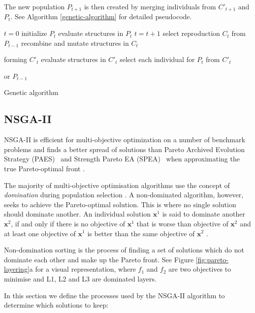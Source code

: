 \documentclass[sigconf]{acmart}
\begin{document}
The new population $P_{t+1}$ is then created by merging individuals from $C'_{t+1}$ and $P_{t}$. See Algorithm \ref{genetic-algorithm} for detailed pseudocode.
%
\begin{algorithm}[t]
\begin{algorithmic}[1]
\State $t=0$
\State initialize $P_{t}$
\State evaluate structures in $P_{t}$
\State $t=t+1$
\State select reproduction $C_{t}$ from $P_{t-1}$
\State recombine and mutate structures in $C_{t}$

forming $C'_{t}$
\State evaluate structures in $C'_{t}$
\State select each individual for $P_{t}$ from $C'_{t}$ 

or $P_{t-1}$
\EndWhile
\caption{Genetic algorithm \cite{FogelDavidB2009}}
\label{genetic-algorithm}
\end{algorithmic}
\end{algorithm}



\subsection{NSGA-II}


NSGA-II is efficient for multi-objective optimization on a number of benchmark problems and finds a better spread of solutions than Pareto Archived Evolution Strategy (PAES)~\cite{Knowles1999} and Strength Pareto EA (SPEA)~\cite{Zitzler2006} when approximating the true Pareto-optimal front \cite{Valkanas2014}.

The majority of multi-objective optimisation algorithms use the concept of \emph{domination} during population selection \cite{Burke2014}. A non-dominated algorithm, however, seeks to achieve the Pareto-optimal solution. This is where no single solution should dominate another. An individual solution $\mathbf{x}^{1}$ is said to dominate another $\mathbf{x}^{2}$, if and only if there is no objective of $\mathbf{x}^{1}$ that is worse than objective of $\mathbf{x}^{2}$ and at least one objective of $\mathbf{x}^{1}$ is better than the same objective of $\mathbf{x}^{2}$ \cite{Bao2017}. 


Non-domination sorting is the process of finding a set of solutions which do not dominate each other and make up the Pareto front. See Figure \ref{fig:pareto-layering}a for a visual representation, where $f_1$ and $f_2$ are two objectives to minimise and L1, L2 and L3 are dominated layers.


In this section we define the processes used by the NSGA-II algorithm to determine which solutions to keep:
\end{document}
